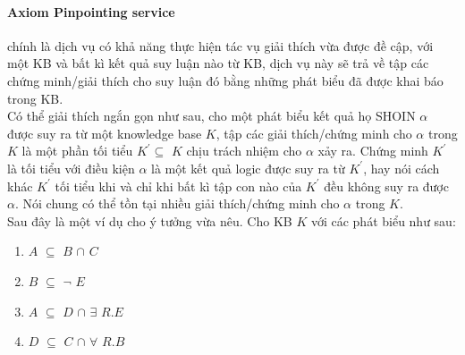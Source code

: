 \paragraph{Axiom Pinpointing service} chính là dịch vụ có khả năng thực hiện tác vụ giải thích vừa được đề cập, với một KB và bất kì kết quả suy luận nào từ KB, dịch vụ này sẽ trả về tập các chứng minh/giải thích cho suy luận đó bằng những phát biểu đã được khai báo trong KB.
\\
\hspace*{0.05\textwidth} Có thể giải thích ngắn gọn như sau, cho một phát biểu kết quả họ SHOIN $\alpha$ được suy ra từ một knowledge base $K$, tập các giải thích/chứng minh cho $\alpha$  trong $K$ là một phần tối tiểu $K^{'}\subseteq$ $K$ chịu trách nhiệm cho $\alpha$ xảy ra. Chứng minh $K^{'}$ là tối tiểu với điều kiện $\alpha$ là một kết quả logic được suy ra từ $K^{'}$, hay nói cách khác $K^{'}$ tối tiểu khi và chỉ khi bất kì tập con nào của $K^{'}$ đều không suy ra được $\alpha$. Nói chung có thể tồn tại nhiều giải thích/chứng minh cho $\alpha$ trong $K$.
\\
Sau đây là một ví dụ cho ý tưởng vừa nêu. Cho KB $K$ với các phát biểu như sau:
\begin{enumerate}
\item	$A$ $\subseteq$ $B$ $\cap$ $C$ 
\item	$B$ $\subseteq$ $\neg$ $E$
\item	$A$ $\subseteq$ $D$ $\cap$ $\exists$ $R.E$ 
\item	$D$ $\subseteq$ $C$ $\cap$ $\forall$ $R.B$
\end{enumerate}

